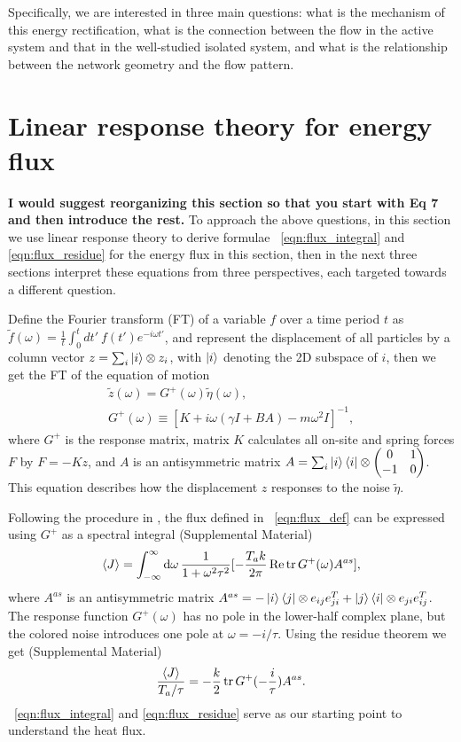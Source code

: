 \documentclass[
 preprint,
 preprintnumbers,
 amsmath,amssymb,
 aps,
 pre,
 longbibliography,
 10pt, twocolumn
]{revtex4-1}
\begin{document}
Specifically, we are interested in three main questions: what is the mechanism of this energy rectification, what is the connection between the flow in the active system and that in the well-studied isolated system, and what is the relationship between the network geometry and the flow pattern.

\section{Linear response theory for energy flux} \label{sec:linear_response}
{\bf I would suggest reorganizing this section so that you start with Eq 7 and then introduce the rest.}
To approach the above questions, in this section we use linear response theory to derive formulae \eqnname~\eqref{eqn:flux_integral} and \eqref{eqn:flux_residue} for the energy flux in this section, then in the next three sections interpret these equations from three perspectives, each targeted towards a different question.

Define the Fourier transform (FT) of a variable $f$ over a time period $t$ as $\tilde{f}(\omega) = \frac{1}{t} \int_0^t dt'\ f(t')e^{-i\omega t'}$, and represent the displacement of all particles by a column vector $z=\sum_i \ket{i}\otimes z_i$, with $\ket{i}$ denoting the 2D subspace of $i$,
then we get the FT of the equation of motion 
\begin{gather} \label{eqn:response}
    \tilde{z}(\omega) = G^+(\omega) \tilde{\eta}(\omega), \\
    G^{+}(\omega) \equiv [K + i\omega(\gamma I + BA) - m\omega^2I]^{-1},
\end{gather}
where $G^+$ is the response matrix, matrix $K$ calculates all on-site and spring forces $F$ by $F=-Kz$, and $A$ is an antisymmetric matrix $A=\sum_i \ket{i}\bra{i}\otimes \mqty(0 & 1 \\ -1 & 0)$.
This equation describes how the displacement $z$ responses to the noise $\tilde{\eta}$.

Following the procedure in \cite{Kundu2011LargeChains}, the flux defined in \eqnname~\eqref{eqn:flux_def} can be expressed using $G^+$ as a spectral integral (Supplemental Material)
\begin{equation} \label{eqn:flux_integral}
\expval{J} = \int_{-\infty}^\infty \dd{\omega} \frac{1}{1+\omega^2\tau^2} [-\frac{T_a k}{2\pi} \Re \tr G^+(\omega)A^{as}] ,
\end{equation}
where $A^{as}$ is an antisymmetric matrix
$A^{as} = -\ket{i}\bra{j} \otimes e_{ij}e_{ji}^T + \ket{j}\bra{i} \otimes e_{ji}e_{ij}^T$.
The response function $G^+(\omega)$ has no pole in the lower-half complex plane, but the colored noise introduces one pole at $\omega = -i/\tau$. Using the residue theorem we get (Supplemental Material)
\begin{equation} \label{eqn:flux_residue}
\frac{\expval{J}}{T_a/\tau} = -\frac{k}{2} \tr G^+(-\frac{i}{\tau})A^{as} .
\end{equation}
\eqnname~\eqref{eqn:flux_integral} and \eqref{eqn:flux_residue} serve as our starting point to understand the heat flux.
\end{document}

